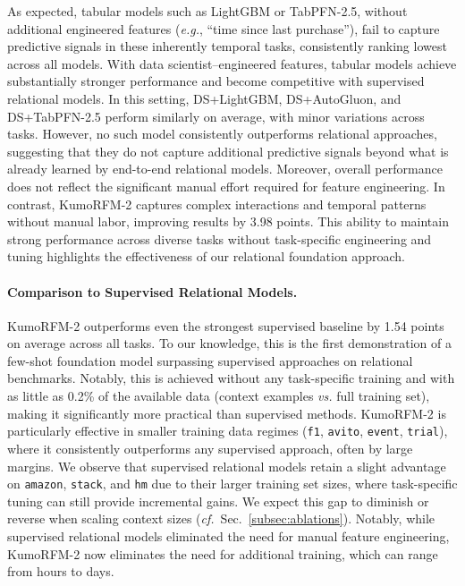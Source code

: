 \documentclass{article}
\newcommand{\twozero}{2\xspace}
\newcommand{\name}{KumoRFM\xspace}
\newcommand{\nametwo}{\name-\twozero}
\begin{document}
As expected, tabular models such as LightGBM or TabPFN-2.5, without additional engineered features (\emph{e.g.}, ``time since last purchase''), fail to capture predictive signals in these inherently temporal tasks, consistently ranking lowest across all models.
With data scientist–engineered features, tabular models achieve substantially stronger performance and become competitive with supervised relational models. In this setting, DS+LightGBM, DS+AutoGluon, and DS+TabPFN-2.5 perform similarly on average, with minor variations across tasks.
However, no such model consistently outperforms relational approaches, suggesting that they do not capture additional predictive signals beyond what is already learned by end-to-end relational models.
Moreover, overall performance does not reflect the significant manual effort required for feature engineering.
In contrast, \nametwo captures complex interactions and temporal patterns without manual labor, improving results by 3.98 points. This ability to maintain strong performance across diverse tasks without task-specific engineering and tuning highlights the effectiveness of our relational foundation approach.

\paragraph{Comparison to Supervised Relational Models.}

\nametwo outperforms even the strongest supervised baseline by 1.54 points on average across all tasks.
To our knowledge, this is the first demonstration of a few-shot foundation model surpassing supervised approaches on relational benchmarks.
Notably, this is achieved without any task-specific training and with as little as 0.2\% of the available data (context examples \emph{vs.} full training set), making it significantly more practical than supervised methods.
\nametwo is particularly effective in smaller training data regimes (\texttt{f1}, \texttt{avito}, \texttt{event}, \texttt{trial}), where it consistently outperforms any supervised approach, often by large margins.
We observe that supervised relational models retain a slight advantage on \texttt{amazon}, \texttt{stack}, and \texttt{hm} due to their larger training set sizes, where task-specific tuning can still provide incremental gains.
We expect this gap to diminish or reverse when scaling context sizes (\emph{cf.}~Sec.~\ref{subsec:ablations}).
Notably, while supervised relational models eliminated the need for manual feature engineering, \nametwo now eliminates the need for additional training, which can range from hours to days.
\end{document}
